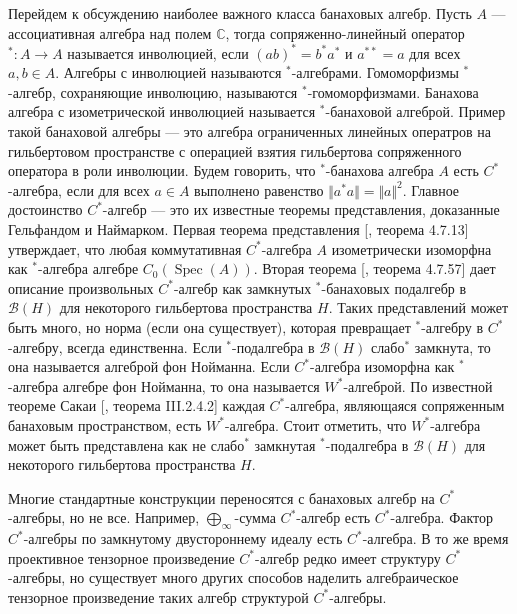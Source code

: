Перейдем к обсуждению наиболее важного класса банаховых алгебр. Пусть $A$ --- ассоциативная алгебра над полем $\mathbb{C}$, тогда сопряженно-линейный оператор ${}^*:A\to A$ называется инволюцией, если $(ab)^*=b^*a^*$ и $a^{**}=a$ для всех $a,b\in A$. Алгебры с инволюцией называются ${}^*$-алгебрами. Гомоморфизмы ${}^*$-алгебр, сохраняющие инволюцию, называются ${}^*$-гомоморфизмами. Банахова алгебра с изометрической инволюцией называется ${}^*$-банаховой алгеброй. Пример такой банаховой алгебры --- это алгебра ограниченных линейных оператров на гильбертовом пространстве с операцией взятия гильбертова сопряженного оператора в роли инволюции. Будем говорить, что ${}^*$-банахова алгебра $A$ есть $C^*$-алгебра, если для всех $a\in A$ выполнено равенство $\Vert a^*a\Vert=\Vert a\Vert^2$. Главное достоинство $C^*$-алгебр --- это их известные теоремы представления, доказанные Гельфандом и Наймарком. Первая теорема представления [\cite{HelBanLocConvAlg}, теорема 4.7.13] утверждает, что любая коммутативная $C^*$-алгебра $A$ изометрически изоморфна как ${}^*$-алгебра алгебре $C_0(\operatorname{Spec}(A))$. Вторая теорема [\cite{HelBanLocConvAlg}, теорема 4.7.57] дает описание произвольных $C^*$-алгебр как замкнутых ${}^*$-банаховых подалгебр в $\mathcal{B}(H)$ для некоторого гильбертова пространства $H$. Таких представлений может быть много, но норма (если она существует), которая превращает ${}^*$-алгебру в $C^*$-алгебру, всегда единственна. Если ${}^*$-подалгебра в $\mathcal{B}(H)$ слабо${}^*$ замкнута, то она называется алгеброй фон Нойманна. Если $C^*$-алгебра изоморфна как ${}^*$-алгебра алгебре фон Нойманна, то она называется $W^*$-алгеброй. По известной теореме Сакаи [\cite{BlackadarOpAlg}, теорема III.2.4.2] каждая $C^*$-алгебра, являющаяся сопряженным банаховым пространством, есть $W^*$-алгебра. Стоит отметить, что $W^*$-алгебра может быть представлена как не слабо${}^*$ замкнутая ${}^*$-подалгебра в $\mathcal{B}(H)$ для некоторого гильбертова пространства $H$. 

Многие стандартные конструкции переносятся с банаховых алгебр на $C^*$-алгебры, но не все. Например,  $\bigoplus_\infty$-сумма $C^*$-алгебр есть $C^*$-алгебра. Фактор $C^*$-алгебры по замкнутому двустороннему идеалу есть $C^*$-алгебра. В то же время проективное тензорное произведение $C^*$-алгебр редко имеет структуру $C^*$-алгебры, но существует много других способов наделить алгебраическое тензорное произведение таких алгебр структурой $C^*$-алгебры. 

